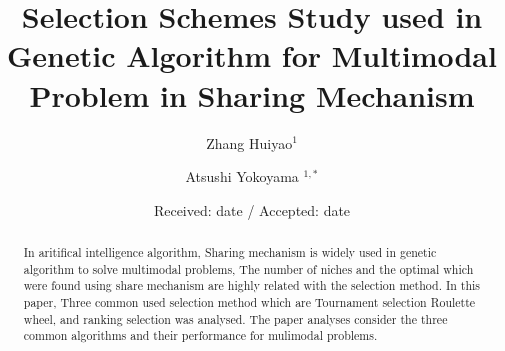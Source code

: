 \documentclass[smallextended]{svjour3}       %
\begin{document}
\title{Selection Schemes Study used in Genetic Algorithm for Multimodal Problem in
Sharing Mechanism}
\author{Zhang Huiyao$^1$  \and
	Atsushi Yokoyama $^{1,*}$
}
\date{Received: date / Accepted: date}
\maketitle

\begin{abstract}
    In aritifical intelligence algorithm, Sharing mechanism is widely used in
    genetic algorithm to solve multimodal problems, The number of niches and the
    optimal which were found using share mechanism are highly related with the
    selection method. In this paper, Three common used selection method which
    are Tournament selection Roulette wheel, and ranking selection was analysed.
    The paper analyses consider the three common algorithms and their
    performance for mulimodal problems.
\end{abstract}
\end{document}
